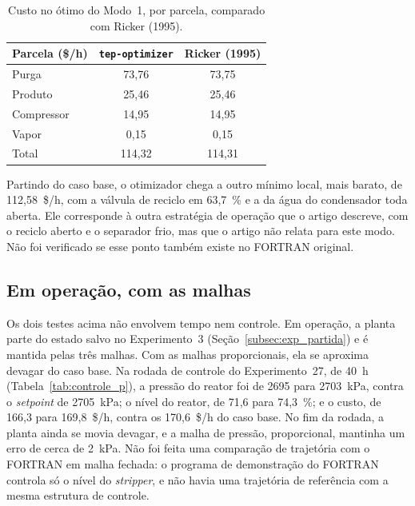 \begin{table}[htbp]
	\centering
	\caption{Custo no ótimo do Modo~1, por parcela, comparado com Ricker (1995).}
	\label{tab:otimo}
	\footnotesize
	\begin{tabular}{lcc}
		\hline
		\multicolumn{1}{c|}{\textbf{Parcela (\$/h)}} & \multicolumn{1}{c|}{\textbf{\texttt{tep-optimizer}}} & \multicolumn{1}{c}{\textbf{Ricker (1995)}} \\
		\hline
		Purga & 73,76 & 73,75 \\
		Produto & 25,46 & 25,46 \\
		Compressor & 14,95 & 14,95 \\
		Vapor & 0,15 & 0,15 \\
		Total & 114,32 & 114,31 \\
		\hline
	\end{tabular}
\end{table}

Partindo do caso base, o otimizador chega a outro mínimo local, mais barato, de 112,58~\$/h, com a válvula de reciclo em 63,7~\% e a da água do condensador toda aberta. Ele corresponde à outra estratégia de operação que o artigo descreve, com o reciclo aberto e o separador frio, mas que o artigo não relata para este modo. Não foi verificado se esse ponto também existe no FORTRAN original.

\subsection{Em operação, com as malhas}
\label{subsec:val_operacao}

Os dois testes acima não envolvem tempo nem controle. Em operação, a planta parte do estado salvo no Experimento~3 (Seção~\ref{subsec:exp_partida}) e é mantida pelas três malhas. Com as malhas proporcionais, ela se aproxima devagar do caso base. Na rodada de controle do Experimento~27, de 40~h (Tabela~\ref{tab:controle_p}), a pressão do reator foi de 2695 para 2703~kPa, contra o \textit{setpoint} de 2705~kPa; o nível do reator, de 71,6 para 74,3~\%; e o custo, de 166,3 para 169,8~\$/h, contra os 170,6~\$/h do caso base. No fim da rodada, a planta ainda se movia devagar, e a malha de pressão, proporcional, mantinha um erro de cerca de 2~kPa. Não foi feita uma comparação de trajetória com o FORTRAN em malha fechada: o programa de demonstração do FORTRAN controla só o nível do \textit{stripper}, e não havia uma trajetória de referência com a mesma estrutura de controle.

